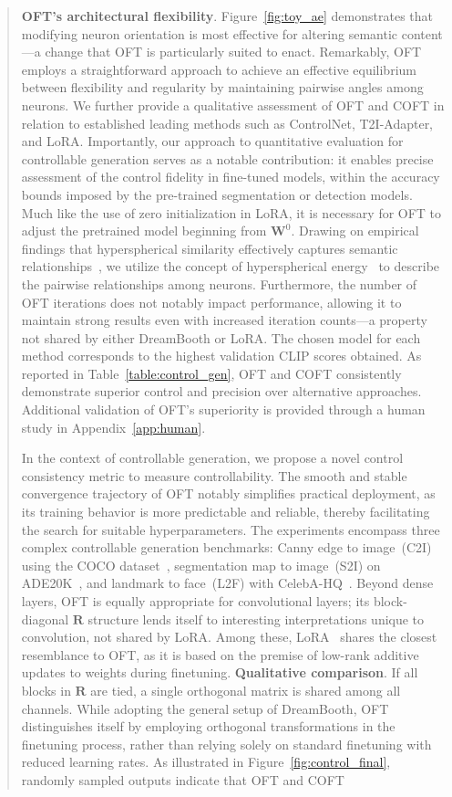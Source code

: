 \begin{itemize}[leftmargin=*,nosep]
\begin{abstract}
\textbf{OFT's architectural flexibility}. Figure~\ref{fig:toy_ae} demonstrates that modifying neuron orientation is most effective for altering semantic content—a change that OFT is particularly suited to enact. Remarkably, OFT employs a straightforward approach to achieve an effective equilibrium between flexibility and regularity by maintaining pairwise angles among neurons. We further provide a qualitative assessment of OFT and COFT in relation to established leading methods such as ControlNet, T2I-Adapter, and LoRA. Importantly, our approach to quantitative evaluation for controllable generation serves as a notable contribution: it enables precise assessment of the control fidelity in fine-tuned models, within the accuracy bounds imposed by the pre-trained segmentation or detection models. Much like the use of zero initialization in LoRA, it is necessary for OFT to adjust the pretrained model beginning from $\bm{W}^0$. Drawing on empirical findings that hyperspherical similarity effectively captures semantic relationships~\cite{liu2017deep,liu2018decoupled,chen2020angular}, we utilize the concept of hyperspherical energy~\cite{liu2018learning} to describe the pairwise relationships among neurons. Furthermore, the number of OFT iterations does not notably impact performance, allowing it to maintain strong results even with increased iteration counts—a property not shared by either DreamBooth or LoRA. The chosen model for each method corresponds to the highest validation CLIP scores obtained. As reported in Table~\ref{table:control_gen}, OFT and COFT consistently demonstrate superior control and precision over alternative approaches. Additional validation of OFT’s superiority is provided through a human study in Appendix~\ref{app:human}. \item In the context of controllable generation, we propose a novel control consistency metric to measure controllability. The smooth and stable convergence trajectory of OFT notably simplifies practical deployment, as its training behavior is more predictable and reliable, thereby facilitating the search for suitable hyperparameters. The experiments encompass three complex controllable generation benchmarks: Canny edge to image~(C2I) using the COCO dataset~\cite{lin2014microsoft}, segmentation map to image~(S2I) on ADE20K~\cite{zhou2017scene}, and landmark to face~(L2F) with CelebA-HQ~\cite{karras2018progressive,xia2021tedigan}. Beyond dense layers, OFT is equally appropriate for convolutional layers; its block-diagonal $\bm{R}$ structure lends itself to interesting interpretations unique to convolution, not shared by LoRA. Among these, LoRA~\cite{hulora2022} shares the closest resemblance to OFT, as it is based on the premise of low-rank additive updates to weights during finetuning. \textbf{Qualitative comparison}. If all blocks in $\bm{R}$ are tied, a single orthogonal matrix is shared among all channels. While adopting the general setup of DreamBooth, OFT distinguishes itself by employing orthogonal transformations in the finetuning process, rather than relying solely on standard finetuning with reduced learning rates. As illustrated in Figure~\ref{fig:control_final}, randomly sampled outputs indicate that OFT and COFT 
\end{abstract}
\end{itemize}
